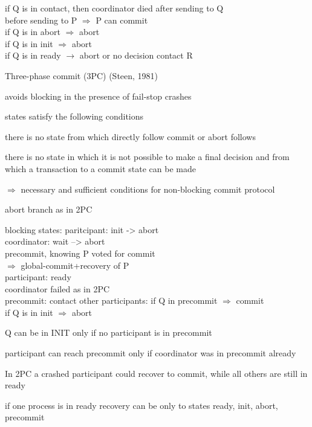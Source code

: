 \begin{compactitem}
\begin{compactitem}
	if Q is in contact, then coordinator died after sending to Q\\
	before sending to P $\Rightarrow$ P can commit\\
	if Q is in abort $\Rightarrow$ abort\\
	if Q is in init $\Rightarrow$ abort\\
	if Q is in ready $\rightarrow$ abort or no decision contact R\\
	\end{compactitem}
	\item Three-phase commit (3PC) (Steen, 1981)\\
	\begin{compactitem}
		\item avoids blocking in the presence of fail-stop crashes
		\item states satisfy the following conditions\\
		\begin{compactenum}
			\item there is no state from which directly follow commit or abort follows
			\item there is no state in which it is not possible to make a final decision and from which a transaction to a commit state can be made
		\end{compactenum}
		$\Rightarrow$ necessary and sufficient conditions for non-blocking commit protocol
		\item abort branch as in 2PC
		\item blocking states: paritcipant: init -> abort\\
		coordinator: wait --> abort\\
		precommit, knowing P voted for commit\\
		$\Rightarrow$ global-commit+recovery of P\\
		participant: ready\\
			coordinator failed as in 2PC\\
			precommit: contact other participants: if Q in precommit $\Rightarrow$ commit\\
			if Q is in init $\Rightarrow$ abort
		\item Q can be in INIT only if no participant is in precommit
		\item participant can reach precommit only if coordinator was in precommit already
		\item In 2PC a crashed participant could recover to commit, while all others are still in ready
		\item if one process is in ready recovery can be only to states ready, init, abort, precommit\\

\end{compactitem}
\end{compactitem}
